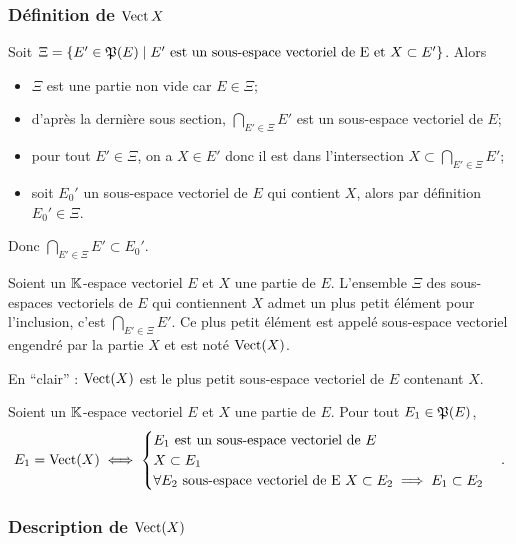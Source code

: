\subsubsection{Définition de \(\operatorname{Vect}{X}\)}

Soit \(\Xi=\left\{E' \in \mathfrak{P}(E)\mathrel{}\middle|\mathrel{}E' \text{~est un sous-espace vectoriel de E et } X \subset E'\right\}\). Alors
\begin{itemize}
  \item \(\Xi\) est une partie non vide car \(E \in \Xi\);
  \item d'après la dernière sous section, \(\bigcap_{E' \in \Xi} E'\) est un sous-espace vectoriel de \(E\);
  \item pour tout \(E' \in \Xi\), on a \(X \in E'\) donc il est dans l'intersection \(X \subset \bigcap_{E' \in \Xi} E'\);
  \item soit \(E_0'\) un sous-espace vectoriel de \(E\) qui contient \(X\), alors par définition \(E_0' \in \Xi\).
\end{itemize}

Donc \(\bigcap_{E' \in \Xi} E' \subset E_0'\).

\begin{defdef}
  Soient un \(\mathbb{K}\)-espace vectoriel \(E\) et \(X\) une partie de \(E\). L'ensemble \(\Xi\) des sous-espaces vectoriels de \(E\) qui contiennent \(X\) admet un plus petit élément pour l'inclusion, c'est \(\bigcap_{E' \in \Xi} E'\). Ce plus petit élément est appelé sous-espace vectoriel engendré par la partie \(X\) et est noté \(\operatorname{Vect}(X)\).

  En ``clair'' : \(\operatorname{Vect}(X)\) est le plus petit sous-espace vectoriel de \(E\) contenant \(X\).
\end{defdef}

\begin{prop}
  Soient un \(\mathbb{K}\)-espace vectoriel \(E\) et \(X\) une partie de \(E\). Pour tout \(E_1 \in \mathfrak{P}(E)\),
  \begin{equation}
    E_1 = \operatorname{Vect}(X) \iff
    \begin{cases}
      E_1 \text{~est un sous-espace vectoriel de } E \\
      X \subset E_1 \\
      \forall E_2 \text{~sous-espace vectoriel de E } X \subset E_2 \implies E_1 \subset E_2
    \end{cases}.
  \end{equation}
\end{prop}

\subsubsection{Description de \(\operatorname{Vect}(X)\)}

